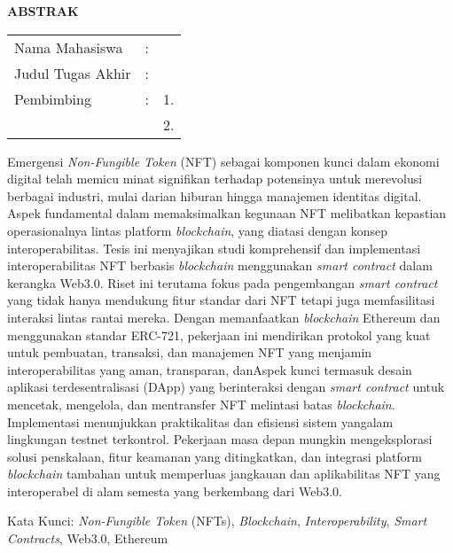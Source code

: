 \begin{center}
  \large\textbf{ABSTRAK}
\end{center}


\vspace{2ex}

\begingroup
\setlength{\tabcolsep}{0pt}

\noindent
\begin{tabularx}{\textwidth}{l >{\centering}m{2em} X}
  Nama Mahasiswa    & : & \name{}         \\

  Judul Tugas Akhir & : & \tatitle{}      \\

  Pembimbing        & : & 1. \advisor{}   \\
                    &   & 2. \coadvisor{} \\
\end{tabularx}
\endgroup

Emergensi \emph{Non-Fungible Token} (NFT) sebagai komponen kunci dalam ekonomi digital telah memicu minat signifikan terhadap potensinya untuk merevolusi berbagai industri, mulai darian hiburan hingga manajemen identitas digital. Aspek fundamental dalam memaksimalkan kegunaan NFT melibatkan kepastian operasionalnya lintas platform \emph{blockchain}, yang diatasi dengan konsep interoperabilitas. Tesis ini menyajikan studi komprehensif dan implementasi interoperabilitas NFT berbasis \emph{blockchain} menggunakan \emph{smart contract} dalam kerangka Web3.0. Riset ini terutama fokus pada pengembangan \emph{smart contract} yang tidak hanya mendukung fitur standar dari NFT tetapi juga memfasilitasi interaksi lintas rantai mereka. Dengan memanfaatkan \emph{blockchain} Ethereum dan menggunakan standar ERC-721, pekerjaan ini mendirikan protokol yang kuat untuk pembuatan, transaksi, dan manajemen NFT yang menjamin interoperabilitas yang aman, transparan, danAspek kunci termasuk desain aplikasi terdesentralisasi (DApp) yang berinteraksi dengan \emph{smart contract} untuk mencetak, mengelola, dan mentransfer NFT melintasi batas \emph{blockchain}. Implementasi menunjukkan praktikalitas dan efisiensi sistem yangalam lingkungan testnet terkontrol. Pekerjaan masa depan mungkin mengeksplorasi solusi penskalaan, fitur keamanan yang ditingkatkan, dan integrasi platform \emph{blockchain} tambahan untuk memperluas jangkauan dan aplikabilitas NFT yang interoperabel di alam semesta yang berkembang dari Web3.0.

Kata Kunci: \emph{Non-Fungible Token} (NFTs), \emph{Blockchain}, \emph{Interoperability}, \emph{Smart Contracts}, Web3.0, Ethereum
